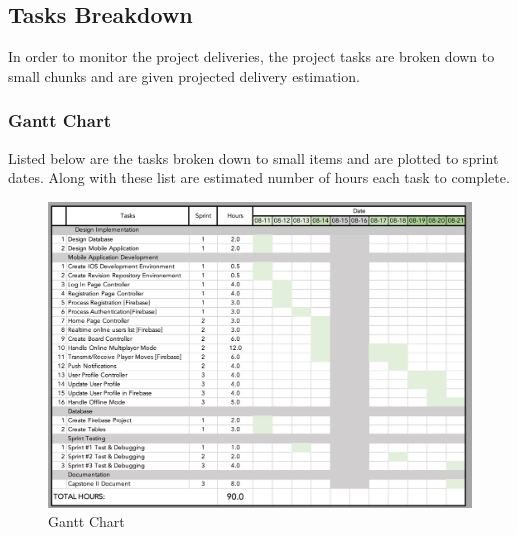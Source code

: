 \documentclass{article}
\begin{document}
    \subsection{Tasks Breakdown}
    In order to monitor the project deliveries, the project tasks are broken down to small chunks and are given projected delivery estimation.
        \subsubsection{Gantt Chart}
        Listed below are the tasks broken down to small items and are plotted to sprint dates.  Along with these list are estimated number of hours each task to complete.
        \begin{figure}[h]
            \centering
            \includegraphics[width=5.5in]{images/Gantt Chart.png}
            \caption{Gantt Chart}
        \end{figure}
        \newpage
\end{document}
